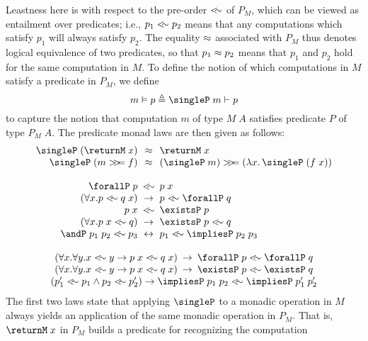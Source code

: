 \documentclass[preprint]{sigplanconf}
\begin{document}
Leastness here is with respect to the pre-order $<\!\!\sim$ of $P_M$, which can be
viewed as entailment over predicates; i.e., $p_1<\!\!\sim p_2$ means that any
computations which satisfy $p_1$ will always satisfy $p_2$. The equality $\approx$
associated with $P_M$ thus denotes logical equivalence of two predicates, so
that $p_1\approx p_2$ means that $p_1$ and $p_2$ hold for the same computation in
$M$. To define the notion of which computations in $M$ satisfy a predicate in
$P_M$, we define
\[
m \vDash p \triangleq \singleP\;m \vdash p
\]
to capture the notion that computation $m$ of type $M\;A$ satisfies predicate
$P$ of type $P_M\;A$.
%
The predicate monad laws are then given as follows:
\[
\begin{array}{@{}c@{}}
\begin{array}{@{}r@{\hspace{5pt}}c@{\hspace{5pt}}l@{}}
  \singleP\;(\returnM\;x) & \lreq & \returnM\;x\\
  \singleP\;(m \bind f) & \lreq
  & (\singleP\;m)\bind (\lamabsnot{x}{\singleP\;(f\;x)})
  \\ \\
  \forallP\;p & \lrleq & p\;x\\
  (\forall x. p \lrleq q\;x) & \to & p \lrleq \forallP\;q\\
  p\;x & \lrleq & \existsP\;p\\
  (\forall x. p\;x \lrleq q) & \to & \existsP\;p \lrleq q\\
  \andP\;p_1\;p_2 \lrleq p_3 & \leftrightarrow & p_1 \lrleq \impliesP\;p_2\;p_3
\end{array}
  \\ \\
\begin{array}{@{}r@{\hspace{5pt}}c@{\hspace{5pt}}l@{}}
  (\forall x.\forall y. x\lrleq y \to p\;x \lrleq q\;x)
  & \to & \forallP\;p \lrleq \forallP\;q\\
  (\forall x.\forall y. x\lrleq y \to p\;x \lrleq q\;x)
  & \to & \existsP\;p \lrleq \existsP\;q
\end{array}
  \\
  (p_1'\lrleq p_1 \wedge p_2\lrleq p_2') \to
  \impliesP\;p_1\;p_2 \lrleq \impliesP\;p_1'\;p_2'
\end{array}
\]
The first two laws state that applying $\singleP$ to a monadic operation in $M$
always yields an application of the same monadic operation in $P_M$. That is,
$\returnM\;x$ in $P_M$ builds a predicate for recognizing the computation
\end{document}
